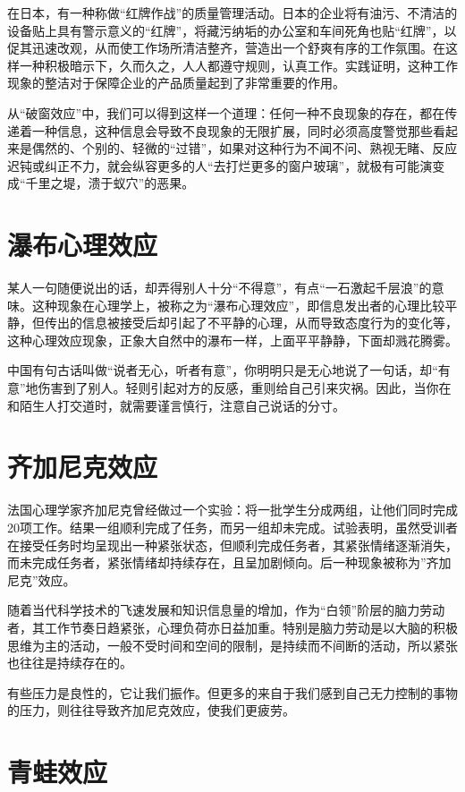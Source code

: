 \documentclass[11pt]{ctexart}
\begin{document}
在日本，有一种称做“红牌作战”的质量管理活动。日本的企业将有油污、不清洁的设备贴上具有警示意义的“红牌”，将藏污纳垢的办公室和车间死角也贴“红牌”，以促其迅速改观，从而使工作场所清洁整齐，营造出一个舒爽有序的工作氛围。在这样一种积极暗示下，久而久之，人人都遵守规则，认真工作。实践证明，这种工作现象的整洁对于保障企业的产品质量起到了非常重要的作用。

从“破窗效应”中，我们可以得到这样一个道理：任何一种不良现象的存在，都在传递着一种信息，这种信息会导致不良现象的无限扩展，同时必须高度警觉那些看起来是偶然的、个别的、轻微的“过错”，如果对这种行为不闻不问、熟视无睹、反应迟钝或纠正不力，就会纵容更多的人“去打烂更多的窗户玻璃”，就极有可能演变成“千里之堤，溃于蚁穴”的恶果。
\section{瀑布心理效应}
\label{sec-80}


某人一句随便说出的话，却弄得别人十分“不得意”，有点“一石激起千层浪”的意味。这种现象在心理学上，被称之为“瀑布心理效应”，即信息发出者的心理比较平静，但传出的信息被接受后却引起了不平静的心理，从而导致态度行为的变化等，这种心理效应现象，正象大自然中的瀑布一样，上面平平静静，下面却溅花腾雾。

中国有句古话叫做“说者无心，听者有意”，你明明只是无心地说了一句话，却“有意”地伤害到了别人。轻则引起对方的反感，重则给自己引来灾祸。因此，当你在和陌生人打交道时，就需要谨言慎行，注意自己说话的分寸。
\section{齐加尼克效应}
\label{sec-81}


法国心理学家齐加尼克曾经做过一个实验：将一批学生分成两组，让他们同时完成20项工作。结果一组顺利完成了任务，而另一组却未完成。试验表明，虽然受训者在接受任务时均呈现出一种紧张状态，但顺利完成任务者，其紧张情绪逐渐消失，而未完成任务者，紧张情绪却持续存在，且呈加剧倾向。后一种现象被称为''齐加尼克''效应。

随着当代科学技术的飞速发展和知识信息量的增加，作为“白领”阶层的脑力劳动者，其工作节奏日趋紧张，心理负荷亦日益加重。特别是脑力劳动是以大脑的积极思维为主的活动，一般不受时间和空间的限制，是持续而不间断的活动，所以紧张也往往是持续存在的。

有些压力是良性的，它让我们振作。但更多的来自于我们感到自己无力控制的事物的压力，则往往导致齐加尼克效应，使我们更疲劳。
\section{青蛙效应}
\label{sec-82}
\end{document}

